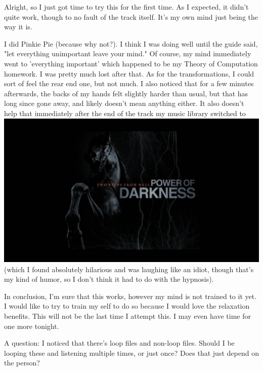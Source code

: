 \documentclass[ebook,12pt,oneside,openany]{memoir}
\begin{document}
\begin{tcolorbox}[title=Antismurf9001]
\par{Alright, so I just got time to try this for the first time.  As I expected, it didn't quite work, though to no fault of the track itself.  It's my own mind just being the way it is.}
\newline{}
\par{I did Pinkie Pie (because why not?).  I think I was doing well until the guide said, "let everything unimportant leave your mind."  Of course, my mind immediately went to 'everything important' which happened to be my Theory of Computation homework.  I was pretty much lost after that.  As for the transformations, I could sort of feel the rear end one, but not much.  I also noticed that for a few minutes afterwards, the backs of my hands felt slightly harder than usual, but that has long since gone away, and likely doesn't mean anything either.  It also doesn't help that immediately after the end of the track my music library switched to}
\href{https://www.youtube.com/watch?v=NSSpM91qSEY}{\includegraphics[width=\textwidth]{thumbnails/NSSpM91qSEY.jpg}}
 (which I found absolutely hilarious and was laughing like an idiot, though that's my kind of humor, so I don't think it had to do with the hypnosis).\newline{}
\par{In conclusion, I'm sure that this works, however my mind is not trained to it yet.  I would like to try to train my self to do so because I would love the relaxation benefits.  This will not be the last time I attempt this.  I may even have time for one more tonight.}
\newline{}
\par{A question: I noticed that there's loop files and non-loop files.  Should I be looping these and listening multiple times, or just once?  Does that just depend on the person?}
\end{tcolorbox}
\end{document}
